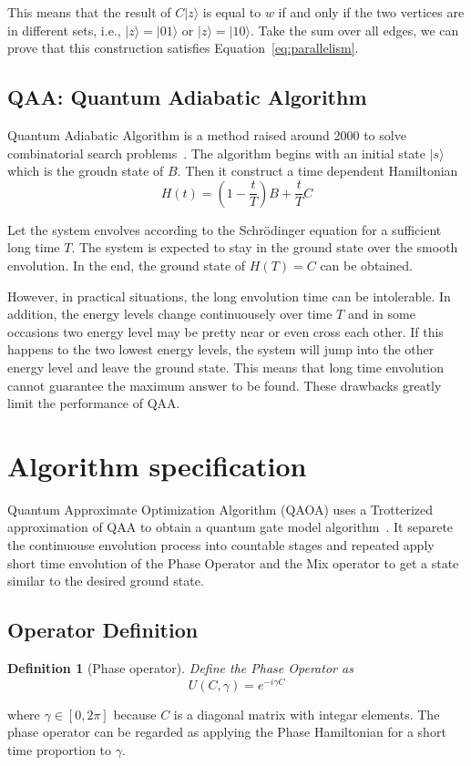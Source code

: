 \documentclass{./source/Report}
\newtheorem{definition}{Definition}
\begin{document}
This means that the result of $C\vert z\rangle$ is equal to $w$ if and only if the two vertices 
are in different sets, i.e., $\vert z \rangle = \vert 01\rangle$ or $\vert z \rangle =\vert 10\rangle$. Take the sum over all 
edges, we can prove that this construction satisfies Equation~\ref{eq:parallelism}.

\subsection{QAA: Quantum Adiabatic Algorithm}

Quantum Adiabatic Algorithm is a method raised around 2000 to solve combinatorial search problems~\cite{farhi2000quantum}. The algorithm 
begins with an initial state $|s\rangle$ which is the groudn state of $B$. Then it construct a time dependent Hamiltonian
\begin{equation}
    H(t)=(1-\frac{t}{T})B+\frac{t}{T}C 
\end{equation} 

Let the system envolves according to the Schrödinger equation for a sufficient long time $T$. The system is expected to 
stay in the ground state over the smooth envolution. In the end, the ground state of $H(T) = C$ can be obtained.

However, in practical situations, the long envolution time can be intolerable. 
In addition, the energy levels change continuousely over time $T$ and in some occasions two 
energy level may be pretty near or even cross each other. If this happens to the two lowest energy levels, 
the system will jump into the other energy level and leave the ground state. This means that long time envolution cannot guarantee
the maximum answer to be found. These drawbacks greatly limit the performance of QAA.

\section{Algorithm specification}

Quantum Approximate Optimization Algorithm (QAOA) uses 
a Trotterized approximation of QAA to obtain a quantum gate model algorithm~\cite{farhi2014quantum}.
It separete the continuouse envolution process into countable stages and repeated apply short 
time envolution of the Phase Operator and the Mix operator to get a state similar to the desired ground state.

\subsection{Operator Definition}
\begin{definition}[Phase operator]
Define the Phase Operator as 
\begin{equation}
    U(C, \gamma)=e^{-i\gamma C}
\end{equation} 
\end{definition}
where $\gamma\in [0, 2\pi]$ because $C$ is a diagonal matrix with integar elements. 
The phase operator can be regarded as applying the Phase Hamiltonian for a short time proportion
to $\gamma$.
\end{document}
